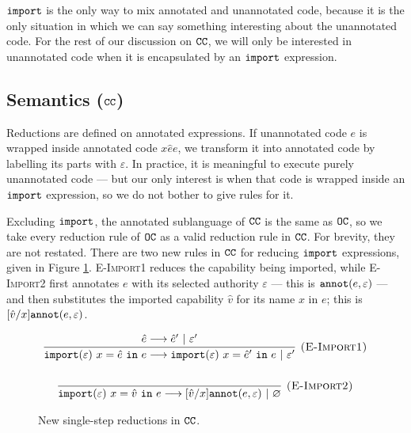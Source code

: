  $\mathtt{import}$ is the only way to mix annotated and unannotated code, because it is the only situation in which we can say something interesting about the unannotated code. For the rest of our discussion on $\mathtt{CC}$, we will only be interested in unannotated code when it is encapsulated by an $\mathtt{import}$ expression.

\subsection{Semantics ($\mathtt{CC}$)}

Reductions are defined on annotated expressions. If unannotated code $e$ is wrapped inside annotated code ${x}{\hat e}{e}$, we transform it into annotated code by labelling its parts with $\varepsilon$. In practice, it is meaningful to execute purely unannotated code --- but our only interest is when that code is wrapped inside an $\mathtt{import}$ expression, so we do not bother to give rules for it.

Excluding $\mathtt{import}$, the annotated sublanguage of $\mathtt{CC}$ is the same as $\mathtt{OC}$, so we take every reduction rule of $\mathtt{OC}$ as a valid reduction rule in $\mathtt{CC}$. For brevity, they are not restated. There are two new rules in $\mathtt{CC}$ for reducing $\mathtt{import}$ expressions, given in Figure \ref{fig:epscalc_reductions}. \textsc{E-Import1} reduces the capability being imported, while \textsc{E-Import2} first annotates $e$ with its selected authority $\varepsilon$ --- this is $\mathtt{annot}(e, \varepsilon)$ --- and then substitutes the imported capability $\hat v$ for its name $x$ in $e$; this is $[\hat v/x]\mathtt{annot}(e, \varepsilon)$.

\begin{figure}[h]


\[
\begin{array}{c}
\infer[\textsc{(E-Import1)}]
	{\kwa{import}(\varepsilon)~x = \hat e~\kw{in} e \longrightarrow \kwa{import}(\varepsilon)~x = \hat e'~\kw{in} e~|~\varepsilon'}
	{\hat e \longrightarrow \hat e'~|~\varepsilon'}\\[4ex]

\infer[\textsc{(E-Import2)}]
	{\kwa{import}(\varepsilon)~x = \hat v~\kw{in} e \longrightarrow [\hat v/x]\kwa{annot}(e, \varepsilon)~|~\varnothing}
	{}

\end{array}
\]


\vspace{-7pt}
\caption{New single-step reductions in $\mathtt{CC}$.}
\label{fig:epscalc_reductions}
\end{figure}

